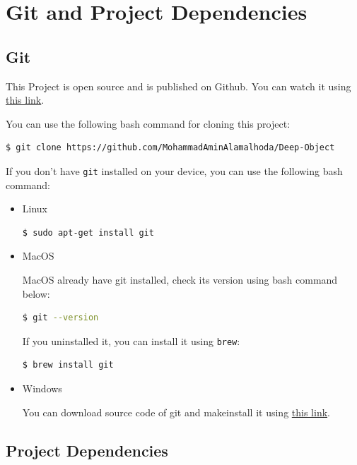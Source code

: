 \documentclass[a4paper, openany]{book}
\newcommand{\code}{\texttt}
\begin{document}
\section{Git and Project Dependencies}

\vspace{0.3cm}
\subsection{Git}
	\vspace{0.3cm}

This Project is open source and is published on Github. You can watch it using \href{https://github.com/MohammadAminAlamalhoda/Deep-Object}{this link}.

You can use the following bash command for cloning this project:

\begin{lstlisting}[language=bash]
  $ git clone https://github.com/MohammadAminAlamalhoda/Deep-Object
  \end{lstlisting}
  
If you don't have \code{git} installed on your device, you can use the following bash command:
\begin{itemize}
\item Linux
\begin{lstlisting}[language=bash]
  $ sudo apt-get install git
  \end{lstlisting}
  
\item MacOS

MacOS already have git installed, check its version using bash command below:

\begin{lstlisting}[language=bash]
  $ git --version
  \end{lstlisting}
If you uninstalled it, you can install it using \code{brew}:
\begin{lstlisting}[language=bash]
  $ brew install git
  \end{lstlisting}
\item Windows

You can download source code of git and make\-install it using \href{https://git-scm.com/download/win}{this link}.
\end{itemize}



\subsection{Project Dependencies}
	\vspace{0.3cm}
\end{document}
